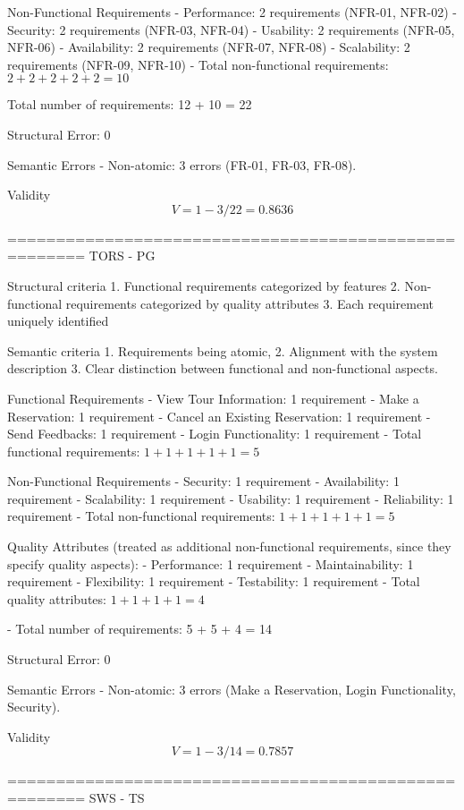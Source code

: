 Non-Functional Requirements
 - Performance: 2 requirements (NFR-01, NFR-02)
 - Security: 2 requirements (NFR-03, NFR-04)
 - Usability: 2 requirements (NFR-05, NFR-06)
 - Availability: 2 requirements (NFR-07, NFR-08)
 - Scalability: 2 requirements (NFR-09, NFR-10)
 - Total non-functional requirements: \( 2 + 2 + 2 + 2 + 2 = 10 \)
 
 Total number of requirements: 12 + 10 = 22
 
 Structural Error: 0
 
 Semantic Errors 
 - Non-atomic: 3 errors (FR-01, FR-03, FR-08).
 
 Validity
 \[
 V = 1 - 3/22 = 0.8636
 \]
 
 ======================================================
 TORS - PG
 
 Structural criteria 
 1. Functional requirements categorized by features
 2. Non-functional requirements categorized by quality attributes
 3. Each requirement uniquely identified
 
 Semantic criteria
 1. Requirements being atomic, 
 2. Alignment with the system description
 3. Clear distinction between functional and non-functional aspects. 
 
 Functional Requirements
 - View Tour Information: 1 requirement
 - Make a Reservation: 1 requirement
 - Cancel an Existing Reservation: 1 requirement
 - Send Feedbacks: 1 requirement
 - Login Functionality: 1 requirement
 - Total functional requirements: \( 1 + 1 + 1 + 1 + 1 = 5 \)
 
 Non-Functional Requirements
 - Security: 1 requirement
 - Availability: 1 requirement
 - Scalability: 1 requirement
 - Usability: 1 requirement
 - Reliability: 1 requirement
 - Total non-functional requirements: \( 1 + 1 + 1 + 1 + 1 = 5 \)
 
 Quality Attributes (treated as additional non-functional requirements, since they specify quality aspects):
 - Performance: 1 requirement
 - Maintainability: 1 requirement
 - Flexibility: 1 requirement
 - Testability: 1 requirement
 - Total quality attributes: \( 1 + 1 + 1 + 1 = 4 \)
 
 - Total number of requirements: 5 + 5 + 4 = 14
 
 Structural Error: 0
  
 Semantic Errors 
 - Non-atomic: 3 errors (Make a Reservation, Login Functionality, Security).
 
 Validity
 \[
 V = 1 - 3/14 = 0.7857
 \]
 
======================================================
SWS - TS

